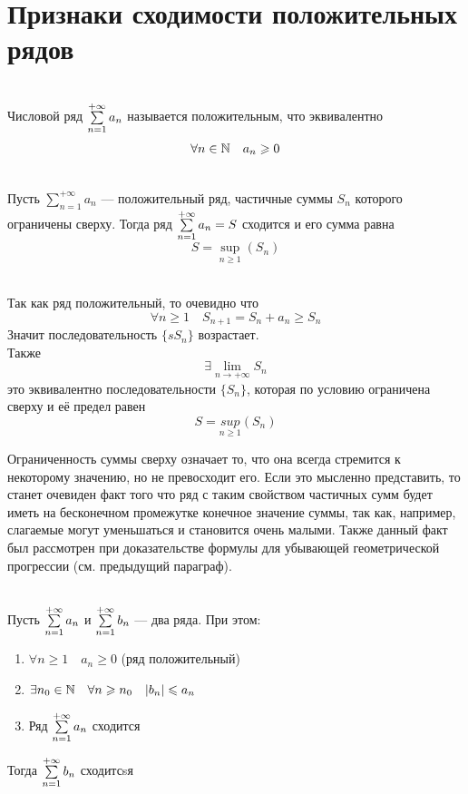 \section{Признаки сходимости положительных рядов}

\begin{Def}~\\
	Числовой ряд $\sum\limits_{n = 1}^{+\infty}{a_n}$ называется положительным, что эквивалентно
    \[
         \forall n \in \mathbb{N} \quad a_n \geqslant 0
    \]
\end{Def}

\begin{Th}~\\
	Пусть $\sum\limits_{n = 1}^{+\infty}a_n$ --- положительный ряд, частичные суммы $S_n$ которого ограничены сверху. Тогда ряд $\sum\limits_{n = 1}^{+\infty}{a_n} = S$ сходится и его сумма равна 
    \[
        S = \underset{n \geqslant 1}{\sup}(S_n)
    \]
\end{Th}

\begin{Proof}~\\
    Так как ряд положительный, то очевидно что
    \[
        \forall n \geqslant 1 \quad S_{n+1} = S_n + a_n \geqslant S_n
    \]
    Значит последовательность $\{sS_n\}$ возрастает.\\
    Также
    \[
        \exists \lim_{n \to +\infty}S_n
    \]
    это эквивалентно последовательности $\{S_n\}$, которая по условию ограничена сверху и её предел равен 
    \[
        S = \underset{n \geq 1}{sup}(S_n)
    \]
\end{Proof}

Ограниченность суммы сверху означает то, что она всегда стремится к некоторому значению, но не превосходит его. Если это мысленно представить, то станет очевиден факт того что ряд с таким свойством частичных сумм будет иметь на бесконечном промежутке конечное значение суммы, так как, например, слагаемые могут уменьшаться и становится очень малыми. Также данный факт был рассмотрен при доказательстве формулы для убывающей геометрической прогрессии (см. предыдущий параграф).


\pagebreak

\begin{Th}~\\
	Пусть $\sum\limits_{n = 1}^{+\infty}{a_n}$ и $\sum\limits_{n = 1}^{+\infty}{b_n}$ --- два ряда. При этом:
	\begin{enumerate}
		\item $\forall n \geq 1 \quad a_n \geq 0$ (ряд положительный)
        
		\item $\exists n_0 \in \mathbb{N} \quad \forall n \geqslant n_0 \quad |b_n| \leqslant a_n$
        
		\item Ряд $\sum\limits_{n = 1}^{+\infty}{a_n}$ сходится
	\end{enumerate}
	Тогда $\sum\limits_{n = 1}^{+\infty}{b_n}$ сходитсsя
\end{Th}


